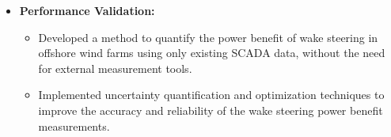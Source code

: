\begin{itemize}[leftmargin=0.15in, label={}]
\begin{itemize}
\begin{itemize}
      \end{itemize}
      \item\small{\textbf{Performance Validation:} }
      \begin{itemize}
        \item\small{Developed a method to quantify the power benefit of wake steering in offshore wind farms using only existing SCADA data, without the need for external measurement tools.}
        \item\small{Implemented uncertainty quantification and optimization techniques to improve the accuracy and reliability of the wake steering power benefit measurements.}
      \end{itemize}
    \end{itemize}\vspace{-5pt}

\end{itemize}
